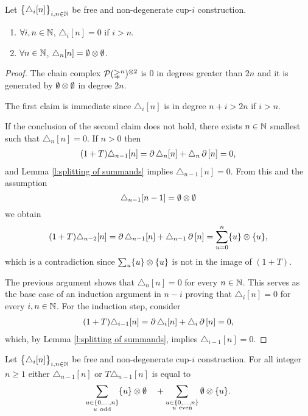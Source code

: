 \begin{lemma} \label{l:special case one}
	Let $\big\{ \triangle_i [n] \big\}_{i,n\in\mathbb{N}}$ be free and non-degenerate \mbox{cup-$i$} construction.
	\begin{enumerate}
		\item $\forall i,n \in \mathbb{N}$, $\triangle_i[n] = 0$ if $i > n$.
		\item $\forall n \in \mathbb{N}$, $\triangle_n[n] = \emptyset \otimes \emptyset$.
	\end{enumerate}
\end{lemma}

\begin{proof}
	The chain complex $\mathcal{P}(\mathbb{\Delta}^n)^{\otimes 2}$ is $0$ in degrees greater than $2n$ and it is generated by $\emptyset \otimes \emptyset$ in degree $2n$.

	The first claim is immediate since $\triangle_i[n]$ is in degree $n+i > 2n$ if $i > n$.

	If the conclusion of the second claim does not hold, there exists $n \in \mathbb{N}$ smallest such that $\triangle_n [n] = 0$.
	If $n > 0$ then
	\begin{align*}
	(1+T) \triangle_{n-1} [n] =
	\operatorname{\partial} \triangle_{n} [n] + \triangle_{n} \operatorname{\partial} \, [n] = 0,
	\end{align*}
	and Lemma \ref{l:splitting of summands} implies $\triangle_{n-1} [n] = 0$.
	From this and the assumption
	\[
	\triangle_{n-1}[n-1] = \emptyset \otimes \emptyset
	\]
	we obtain
	\begin{equation}
	\begin{split}
	(1+T)\triangle_{n-2} [n] =
	\operatorname{\partial} \triangle_{n-1} [n] + \triangle_{n-1} \operatorname{\partial} \, [n] =
	\sum_{u = 0}^n \{u\} \otimes \{u\},
	\end{split}
	\end{equation}
	which is a contradiction since $\sum_u \{u\} \otimes \{u\}$ is not in the image of $(1+T)$.

	The previous argument shows that $\triangle_n [n] = 0$ for every $n \in \mathbb{N}$.
	This serves as the base case of an induction argument in $n-i$ proving that $\triangle_i [n] = 0$ for every $i, n \in \mathbb{N}$.
	For the induction step, consider
	\begin{align*}
	(1+T) \triangle_{i-1} [n] =
	\operatorname{\partial} \triangle_{i} [n] + \triangle_{i} \operatorname{\partial}\, [n] = 0,
	\end{align*}
	which, by Lemma \ref{l:splitting of summands}, implies $\triangle_{i-1} [n] = 0$.
\end{proof}

\begin{lemma} \label{l:special case two}
	Let $\big\{ \triangle_i [n] \big\}_{i,n\in\mathbb{N}}$ be free and non-degenerate \mbox{cup-$i$} construction.
	For all integer $n \geq 1$ either $\triangle_{n-1} [n]$ or $T \triangle_{n-1} [n]$ is equal to
	\[
	\sum_{\substack{u \in \{0,\dots,n\} \\ u \ \mathrm{odd}}} \{u\} \otimes \emptyset
	\quad +
	\sum_{\substack{u \in \{0,\dots,n\} \\ u \ \mathrm{even}}} \emptyset \otimes \{u\}.
	\]
\end{lemma}

